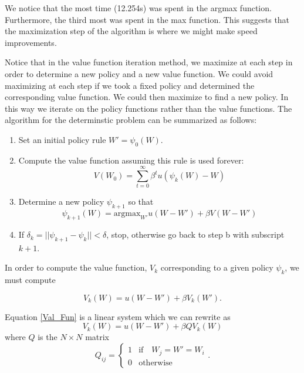 We notice that the most time (12.254s) was spent in the argmax function.  Furthermore, the third most was spent in the max function.  This suggests that the maximization step of the algorithm is where we might make speed improvements.

Notice that in the value function iteration method, we maximize at each step in order to determine a new policy and a new value function.  We could avoid maximizing at each step if we took a fixed policy and determined the corresponding value function.  We could then maximize to find a new policy.  In this way we iterate on the policy functions rather than the value functions.  The algorithm for the determinstic problem can be summarized as follows:

\begin{enumerate}
	\item Set an initial policy rule $W' = \psi_0(W)$.
	
	\item Compute the value function assuming this rule is used forever:
\begin{equation}
V(W_0) = \sum_{t=0}^\infty \beta^t u(\psi_k(W)-W)
\end{equation}


	\item Determine a new policy $\psi_{k+1}$ so that
	\begin{equation}
		\psi_{k+1}(W) = \text{argmax}_{W'} u(W-W') + \beta V(W-W')
	\end{equation}
	
	\item If $\delta_k = ||\psi_{k+1} - \psi_k|| < \delta$, stop, otherwise go back to step b with subscript $k+1$.
\end{enumerate}

In order to compute the value function, $V_k$ corresponding to a given policy $\psi_k$, we must compute

\begin{equation}\label{Val_Fun}
V_k(W) = u(W-W') + \beta V_k(W').
\end{equation}

Equation \eqref{Val_Fun} is a linear system which we can rewrite as
\begin{equation}\label{linear}
V_k(W) = u(W-W') + \beta QV_k(W)
\end{equation}
where $Q$ is the $N\times N$ matrix
\begin{equation}
Q_{ij} = \left\{
     \begin{array}{lr}
       1 & \text{if} \quad  W_j = W' = W_i\\
       0 & \text{otherwise}
     \end{array}
   \right. .
\end{equation}

